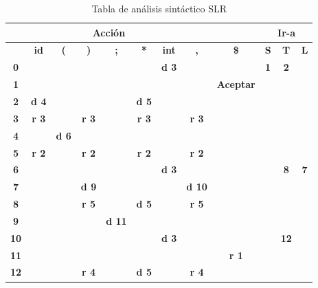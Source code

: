 \begin{table}[htp]
    \caption{Tabla de análisis sintáctico SLR}
    \label{tab:tabla-SLR}
    \centering
    \begin{tabular}{| c | c | c | c | c | c | c | c | c || c | c | c |}
      \hline \multicolumn{8}{|c}{\bf Acción} & &\multicolumn{3}{c|}{\bf Ir-a}  \\
      \hline                   & \textbf{id} & \textbf{(} & \textbf{)} & \textbf{;} & \textbf{*} & \textbf{int}                  & \textbf{,} & \textbf{\$} & \textbf{S} & \textbf{T} & \textbf{L} \\ 
      \hline \hline \textbf{0} &             &            &            &            &            & \textbf{d 3} &            &              & \textbf{1} & \textbf{2} & \\ 
      \hline \textbf{1}        &             &            &            &            &            &                               &            & \textbf{Aceptar}         &  &  & \\ 
      \hline \textbf{2}        & \textbf{d 4} &  &  &  & \textbf{d 5} & & & & & & \\ 
      \hline \textbf{3}        & \textbf{r 3} &  & \textbf{r 3} &  & \textbf{r 3} & & \textbf{r 3} & & & & \\
      \hline \textbf{4}        &  & \textbf{d 6} &  &  & & & & & & & \\ 
      \hline \textbf{5}        & \textbf{r 2} &  & \textbf{r 2} &  & \textbf{r 2} & & \textbf{r 2} & & & & \\
      \hline \textbf{6}        &  &  &  &  & & \textbf{d 3} & & & & \textbf{8} & \textbf{7} \\ 
      \hline \textbf{7}        &  &  & \textbf{d 9} &  & &  & \textbf{d 10} & & & &  \\ 
      \hline \textbf{8}        &  &  & \textbf{r 5} &  & \textbf{d 5}  &  & \textbf{r 5} & & & & \\
      \hline \textbf{9}        &  &  &  & \textbf{d 11} &   &  & & & & & \\
      \hline \textbf{10}       &             &             &           &             &            &  \textbf{d 3}  &  &  &  & \textbf{12} & \\ 
      \hline \textbf{11}       &  &  &  &  &   &  & & \textbf{r 1} & & & \\
      \hline \textbf{12}       &  &  & \textbf{r 4} &  & \textbf{d 5} &  & \textbf{r 4} &  & & & \\
      \hline
    \end{tabular}
\end{table}


